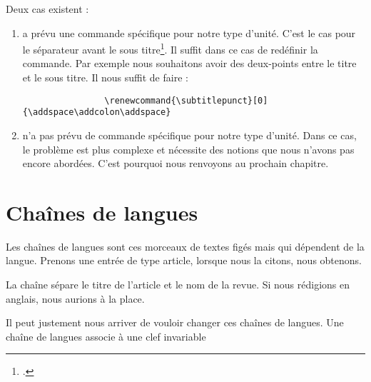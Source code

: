 	Deux cas existent :
		\begin{enumerate}
			\item {} a prévu une commande spécifique pour notre type d'unité. C'est le cas pour le séparateur avant le sous titre\footcite[Ces commandes sont peu nombreuse : on les trouvera dans][89-91]{biblatex}. Il suffit dans ce cas de redéfinir la commande. Par exemple nous souhaitons avoir des deux-points entre le titre et le sous titre. Il nous suffit de faire :
			\begin{verbatim}
				\renewcommand{\subtitlepunct}[0]{\addspace\addcolon\addspace}
			\end{verbatim}
			
			\item {} n'a pas prévu de commande spécifique pour notre type d'unité. Dans ce cas, le problème est plus complexe et nécessite des notions que nous n'avons pas encore abordées. C'est pourquoi nous renvoyons au prochain chapitre.
		\end{enumerate}
		
	\section{Chaînes de langues}
	
	Les chaînes de langues sont ces morceaux de textes figés mais qui dépendent de la langue. Prenons une entrée de type article, lorsque nous la citons, nous obtenons.
	
	\begin{quotation}
		\cite{Amsler1997}
	\end{quotation}
	
	La chaîne  sépare le titre de l'article et le nom de la revue. Si nous rédigions en anglais, nous aurions  à la place. 
	
	Il peut justement nous arriver de vouloir changer ces chaînes de langues. Une chaîne de langues associe à une clef invariable